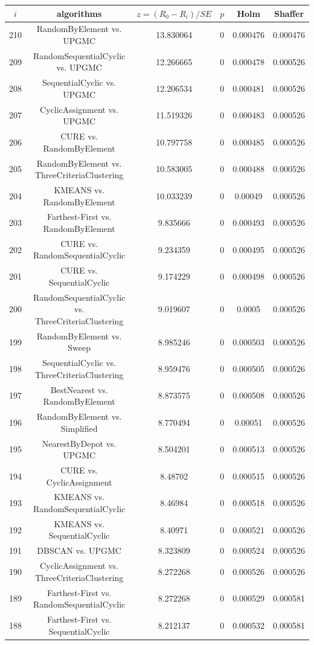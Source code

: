 \documentclass[a4paper,10pt]{article}
\begin{document}
\begin{landscape}
\begin{table}[!htp]
\centering\scriptsize
\begin{tabular}{cccccc}
$i$&algorithms&$z=(R_0 - R_i)/SE$&$p$&Holm&Shaffer\\
\hline210&RandomByElement vs. UPGMC&13.830064&0&0.000476&0.000476\\
209&RandomSequentialCyclic vs. UPGMC&12.266665&0&0.000478&0.000526\\
208&SequentialCyclic vs. UPGMC&12.206534&0&0.000481&0.000526\\
207&CyclicAssignment vs. UPGMC&11.519326&0&0.000483&0.000526\\
206&CURE vs. RandomByElement&10.797758&0&0.000485&0.000526\\
205&RandomByElement vs. ThreeCriteriaClustering&10.583005&0&0.000488&0.000526\\
204&KMEANS vs. RandomByElement&10.033239&0&0.00049&0.000526\\
203&Farthest-First vs. RandomByElement&9.835666&0&0.000493&0.000526\\
202&CURE vs. RandomSequentialCyclic&9.234359&0&0.000495&0.000526\\
201&CURE vs. SequentialCyclic&9.174229&0&0.000498&0.000526\\
200&RandomSequentialCyclic vs. ThreeCriteriaClustering&9.019607&0&0.0005&0.000526\\
199&RandomByElement vs. Sweep&8.985246&0&0.000503&0.000526\\
198&SequentialCyclic vs. ThreeCriteriaClustering&8.959476&0&0.000505&0.000526\\
197&BestNearest vs. RandomByElement&8.873575&0&0.000508&0.000526\\
196&RandomByElement vs. Simplified&8.770494&0&0.00051&0.000526\\
195&NearestByDepot vs. UPGMC&8.504201&0&0.000513&0.000526\\
194&CURE vs. CyclicAssignment&8.48702&0&0.000515&0.000526\\
193&KMEANS vs. RandomSequentialCyclic&8.46984&0&0.000518&0.000526\\
192&KMEANS vs. SequentialCyclic&8.40971&0&0.000521&0.000526\\
191&DBSCAN vs. UPGMC&8.323809&0&0.000524&0.000526\\
190&CyclicAssignment vs. ThreeCriteriaClustering&8.272268&0&0.000526&0.000526\\
189&Farthest-First vs. RandomSequentialCyclic&8.272268&0&0.000529&0.000581\\
188&Farthest-First vs. SequentialCyclic&8.212137&0&0.000532&0.000581\\

\end{tabular}
\end{table}
\end{landscape}
\end{document}
